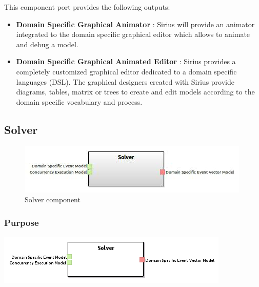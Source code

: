 \documentclass{gemoc} %
\begin{document}
This component port provides the following outputs:
\begin{itemize}
  \item \textbf{Domain Specific Graphical Animator} :
Sirius will provide an animator integrated to the domain specific graphical editor which allows to animate and debug a model. 
  \item \textbf{Domain Specific Graphical Animated Editor} :
Sirius provides a completely customized graphical editor dedicated to a domain specific languages (DSL). The graphical designers created with Sirius provide diagrams, tables, matrix or trees to create and edit models according to the domain specific vocabulary and process.
\end{itemize}

\subsection{Solver}

\begin{figure}[htp]
	\begin{center}
	\includegraphics*[trim=0.0cm 0.0cm 0cm 0.0cm, clip=true, scale=1.0]{../images/generated/Generated_Solver.jpg}
	\caption{Solver component}
	\end{center}
\end{figure}

\subsubsection{Purpose}

\begin{center}
\includegraphics*[trim=0.0cm 0.0cm 0cm 0.0cm, clip=true]{../images/generated/Generated_Solver.png}
\end{center}
\end{document}
